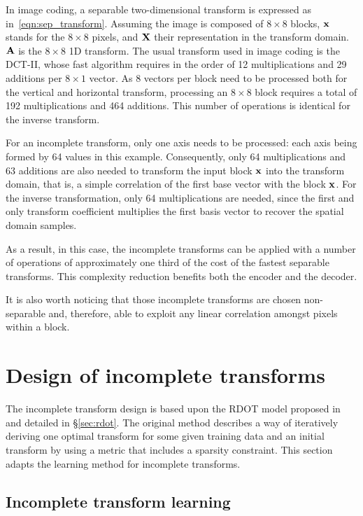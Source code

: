 \documentclass[11pt,a4paper,openright,twoside]{book}
\numberwithin{equation}{section} %
\numberwithin{figure}{section} %
\numberwithin{table}{section} %
\begin{document}
In image coding, a separable two-dimensional transform is expressed as
in~\eqref{eqn:sep_transform}.
Assuming the image is composed of $8\times8$ blocks, $\mathbf{x}$ stands for the
$8\times8$ pixels, and $\mathbf{X}$ their representation in the transform domain.
$\mathbf{A}$ is the $8\times8$ 1D transform.
The usual transform used in image coding is the \ac{DCT}-II, whose fast
algorithm requires in the order of 12 multiplications and 29 additions per
$8\times1$ vector.
As $8$ vectors per block need to be processed both for the vertical and
horizontal transform, processing an $8\times8$ block requires a total of 192
multiplications and 464 additions.
This number of operations is identical for the inverse transform.

For an incomplete transform, only one axis needs to be processed:
each axis being formed by 64 values in this example.
Consequently, only 64 multiplications and 63 additions are also needed to
transform the input block $\mathbf{x}$ into the transform domain, that is, a simple
correlation of the first base vector with the block $\mathbf{x}$.
For the inverse transformation, only 64 multiplications are needed, since the
first and only transform coefficient multiplies the first basis vector to
recover the spatial domain samples.

As a result, in this case, the incomplete transforms can be applied with a
number of operations of approximately one third of the cost of the fastest
separable transforms.
This complexity reduction benefits both the encoder and the decoder.

It is also worth noticing that those incomplete transforms are chosen
non-separable and, therefore, able to exploit any linear correlation amongst
pixels within a block.

\section{Design of incomplete transforms}
\label{sec:it_design_of_incomplete_transforms}

The incomplete transform design is based upon the \ac{RDOT} model proposed
in~\cite{sezer-08-sparse-orthonormal-transforms} and detailed in
\S\ref{sec:rdot}.
The original method describes a way of iteratively deriving one optimal
transform for some given training data and an initial transform by using a
metric that includes a sparsity constraint.
This section adapts the learning method for incomplete transforms.

\subsection{Incomplete transform learning}
\label{sub:it_incomplete_transform_learning}
\end{document}
